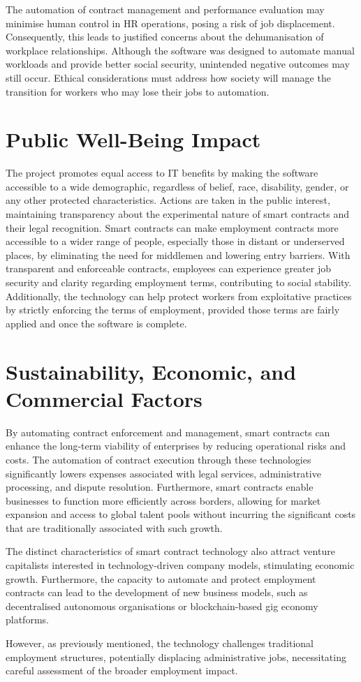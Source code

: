 The automation of contract management and performance evaluation may minimise human control in HR operations, posing a risk of job displacement. Consequently, this leads to justified concerns about the dehumanisation of workplace relationships. Although the software was designed to automate manual workloads and provide better social security, unintended negative outcomes may still occur. Ethical considerations must address how society will manage the transition for workers who may lose their jobs to automation.

\section{Public Well-Being Impact}

The project promotes equal access to IT benefits by making the software accessible to a wide demographic, regardless of belief, race, disability, gender, or any other protected characteristics. Actions are taken in the public interest, maintaining transparency about the experimental nature of smart contracts and their legal recognition. Smart contracts can make employment contracts more accessible to a wider range of people, especially those in distant or underserved places, by eliminating the need for middlemen and lowering entry barriers. With transparent and enforceable contracts, employees can experience greater job security and clarity regarding employment terms, contributing to social stability. Additionally, the technology can help protect workers from exploitative practices by strictly enforcing the terms of employment, provided those terms are fairly applied and once the software is complete.

\section{Sustainability, Economic, and Commercial Factors}

By automating contract enforcement and management, smart contracts can enhance the long-term viability of enterprises by reducing operational risks and costs. The automation of contract execution through these technologies significantly lowers expenses associated with legal services, administrative processing, and dispute resolution. Furthermore, smart contracts enable businesses to function more efficiently across borders, allowing for market expansion and access to global talent pools without incurring the significant costs that are traditionally associated with such growth.

The distinct characteristics of smart contract technology also attract venture capitalists interested in technology-driven company models, stimulating economic growth. Furthermore, the capacity to automate and protect employment contracts can lead to the development of new business models, such as decentralised autonomous organisations or blockchain-based gig economy platforms.

However, as previously mentioned, the technology challenges traditional employment structures, potentially displacing administrative jobs, necessitating careful assessment of the broader employment impact.
